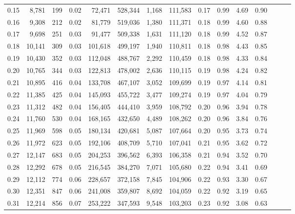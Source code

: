 \begin{tabular}{rrrrrrrrrrrrrrr}
0.15 &   8,781 &    199 &  0.02 &   72,471 &  528,344 &    1,168 &  111,583 &  0.17 &  0.99 &  4.69 &      0.90 \\
0.16 &   9,308 &    212 &  0.02 &   81,779 &  519,036 &    1,380 &  111,371 &  0.18 &  0.99 &  4.60 &      0.88 \\
0.17 &   9,698 &    251 &  0.03 &   91,477 &  509,338 &    1,631 &  111,120 &  0.18 &  0.99 &  4.52 &      0.87 \\
0.18 &  10,141 &    309 &  0.03 &  101,618 &  499,197 &    1,940 &  110,811 &  0.18 &  0.98 &  4.43 &      0.85 \\
0.19 &  10,430 &    352 &  0.03 &  112,048 &  488,767 &    2,292 &  110,459 &  0.18 &  0.98 &  4.33 &      0.84 \\
0.20 &  10,765 &    344 &  0.03 &  122,813 &  478,002 &    2,636 &  110,115 &  0.19 &  0.98 &  4.24 &      0.82 \\
0.21 &  10,895 &    416 &  0.04 &  133,708 &  467,107 &    3,052 &  109,699 &  0.19 &  0.97 &  4.14 &      0.81 \\
0.22 &  11,385 &    425 &  0.04 &  145,093 &  455,722 &    3,477 &  109,274 &  0.19 &  0.97 &  4.04 &      0.79 \\
0.23 &  11,312 &    482 &  0.04 &  156,405 &  444,410 &    3,959 &  108,792 &  0.20 &  0.96 &  3.94 &      0.78 \\
0.24 &  11,760 &    530 &  0.04 &  168,165 &  432,650 &    4,489 &  108,262 &  0.20 &  0.96 &  3.84 &      0.76 \\
0.25 &  11,969 &    598 &  0.05 &  180,134 &  420,681 &    5,087 &  107,664 &  0.20 &  0.95 &  3.73 &      0.74 \\
0.26 &  11,972 &    623 &  0.05 &  192,106 &  408,709 &    5,710 &  107,041 &  0.21 &  0.95 &  3.62 &      0.72 \\
0.27 &  12,147 &    683 &  0.05 &  204,253 &  396,562 &    6,393 &  106,358 &  0.21 &  0.94 &  3.52 &      0.70 \\
0.28 &  12,292 &    678 &  0.05 &  216,545 &  384,270 &    7,071 &  105,680 &  0.22 &  0.94 &  3.41 &      0.69 \\
0.29 &  12,112 &    774 &  0.06 &  228,657 &  372,158 &    7,845 &  104,906 &  0.22 &  0.93 &  3.30 &      0.67 \\
0.30 &  12,351 &    847 &  0.06 &  241,008 &  359,807 &    8,692 &  104,059 &  0.22 &  0.92 &  3.19 &      0.65 \\
0.31 &  12,214 &    856 &  0.07 &  253,222 &  347,593 &    9,548 &  103,203 &  0.23 &  0.92 &  3.08 &      0.63 \\

\end{tabular}
